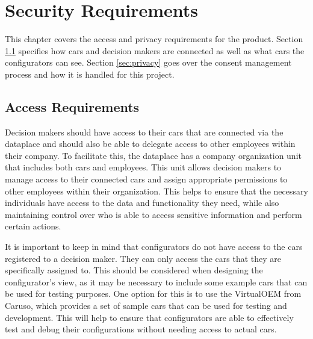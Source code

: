 \chapter{Security Requirements}

This chapter covers the access and privacy requirements for the product. Section \ref{sec:access} specifies how cars and decision makers are connected as well as what cars the configurators can see. Section \ref{sec:privacy} goes over the consent management process and how it is handled for this project.

\section{Access Requirements}
\label{sec:access}
Decision makers should have access to their cars that are connected via the \gls{dataplace} and should also be able to delegate access to other employees within their company. To facilitate this, the \gls{dataplace} has a company organization unit that includes both cars and employees. This unit allows decision makers to manage access to their connected cars and assign appropriate permissions to other employees within their organization. This helps to ensure that the necessary individuals have access to the data and functionality they need, while also maintaining control over who is able to access sensitive information and perform certain actions.

It is important to keep in mind that configurators do not have access to the cars registered to a decision maker. They can only access the cars that they are specifically assigned to. This should be considered when designing the configurator's view, as it may be necessary to include some example cars that can be used for testing purposes. One option for this is to use the VirtualOEM from Caruso, which provides a set of sample cars that can be used for testing and development. This will help to ensure that configurators are able to effectively test and debug their configurations without needing access to actual cars.

